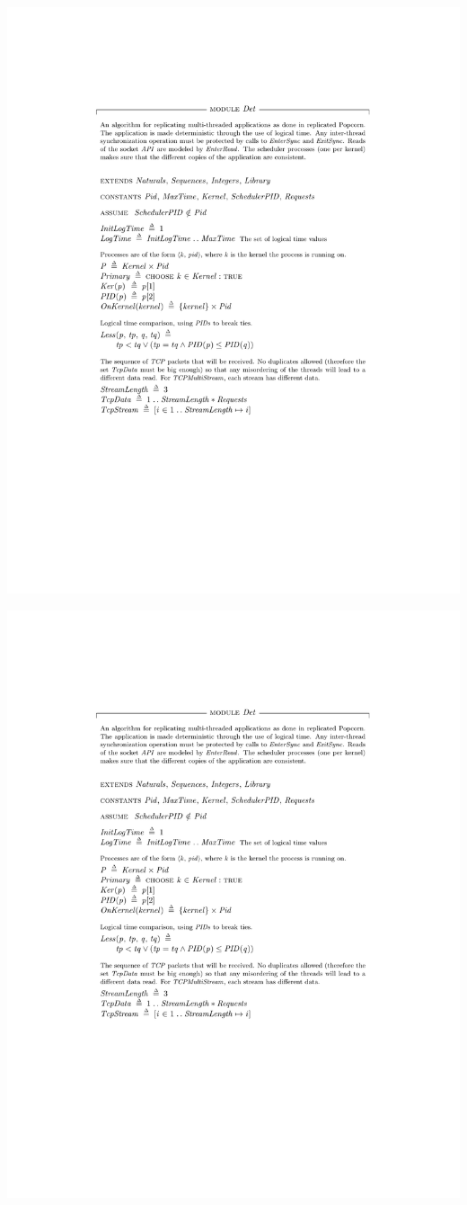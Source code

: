 \documentclass[12pt]{report}
\begin{document}
\begin{appendices}
\hspace{-2.5cm}\includegraphics[page=5,scale=1]{tla/Det.pdf}

\hspace{-2.5cm}\includegraphics[page=6,scale=1]{tla/Det.pdf}
\end{appendices}
\end{document}
